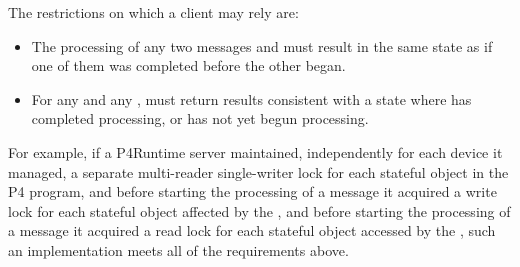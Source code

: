 \documentclass[11pt]{article}
\begin{document}
{%
The restrictions on which a client may rely are:%

\begin{itemize}[noitemsep,topsep=\mdcompacttopsep]%

\item{}The processing of any two  messages  and  must
result in the same state as if one of them was completed before the
other began.%

\item{}For any   and any  ,  must
return results consistent with a state where  has completed
processing, or  has not yet begun processing.%
\end{itemize}%

\noindent{}For example, if a P4Runtime server maintained, independently for each
device it managed, a separate multi-reader single-writer lock for each
stateful object in the P4 program, and before starting the processing
of a  message it acquired a write lock for each stateful
object affected by the , and before starting the
processing of a  message it acquired a read lock for each
stateful object accessed by the , such an implementation
meets all of the requirements above.%

}
\end{document}
